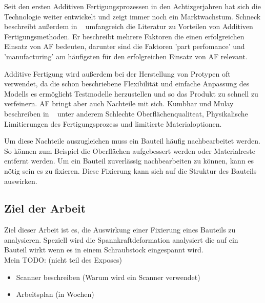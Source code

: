 \documentclass[../main.tex]{subfiles}
\begin{document}
    
    Seit den ersten Additiven Fertigungsprozessen in den Achtizgerjahren
    hat sich die Technologie weiter entwickelt und zeigt immer noch ein Marktwachstum.
    Schneck beschreibt außerdem in ~\cite{SCHNECK201919} umfangreich die Literatur zu Vorteilen von Additiven 
    Fertigungsmethoden. Er beschreibt mehrere Faktoren die einen erfolgreichen Einsatz von AF bedeuten, 
    darunter sind die Faktoren 'part perfomance' und 'manufacturing' am häufigsten für den erfolgreichen Einsatz von AF relevant.
    
    Additive Fertigung wird außerdem bei der Herstellung von Protypen oft verwendet, 
    da die schon beschriebene Flexibilität 
    und einfache Anpassung des Modells es ermöglicht Testmodelle herzustellen und 
    so das Produkt zu schnell zu verfeinern.    
    AF bringt aber auch Nachteile mit sich. Kumbhar und Mulay beschreiben in ~\cite{Kumbhar2018} unter anderem 
    Schlechte Oberflächenqualiteat, Physikalische Limitierungen des Fertigungsprozess und limitierte Materialoptionen.
    
    Um diese Nachteile auszugleichen muss ein Bauteil häufig nachbearbeitet werden. So können zum Beispiel die Oberflächen 
    aufgebessert werden oder Materialreste entfernt werden. Um ein Bauteil zuverlässig nachbearbeiten zu können, 
    kann es nötig sein es zu fixieren.
    Diese Fixierung kann sich auf die Struktur des Bauteils auswirken.

    \subsection*{Ziel der Arbeit}
    Ziel dieser Arbeit ist es, die Auswirkung einer Fixierung eines Bauteils zu analysieren.
    Speziell wird die Spannkraftdeformation analysiert die auf ein Bauteil wirkt wenn es in einem
    Schraubstock eingespannt wird.\\
    
Mein TODO: (nicht teil des Exposes)
\begin{itemize}
    \item Scanner beschreiben (Warum wird ein Scanner verwendet)
    \item Arbeitsplan (in Wochen)
\end{itemize}
\end{document}
